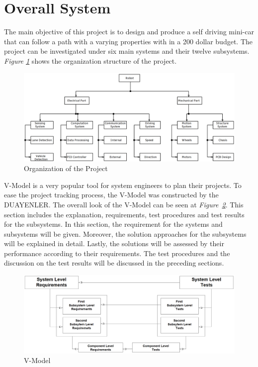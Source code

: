 \documentclass[a4paper,12pt]{article}
\begin{document}
\section{Overall System} 


The main objective of this project is to design and produce a self driving mini-car that can follow a path with a varying properties with in a 200 dollar budget. The project can be investigated under six main systems and their twelve subsystems. \textit{Figure \ref{fig:organization}} shows the organization structure of the project.






\begin{figure}[h]

\includegraphics[width=\textwidth,center]{images/system}

\caption{Organization of the Project}\label{fig:organization}

\end{figure}





V-Model is a very popular tool for system engineers to plan their projects. To ease the project tracking process, the V-Model was constructed by the DUAYENLER. The overall look of the V-Model can be seen at \textit{Figure~\ref{fig:vmodel}}. This section includes the explanation, requirements, test procedures and test results for the subsystems. In this section, the requirement for the systems and subsystems will be given. Moreover, the solution approaches for the subsystems will be explained in detail. Lastly, the solutions will be assessed by their performance according to their requirements. The test procedures and the discussion on the test results will be discussed in the preceding sections.


\begin{figure}[h]

\includegraphics[width=\textwidth,center]{images/vModels/vmodel}

\caption{V-Model}\label{fig:vmodel}

\end{figure}
\end{document}
